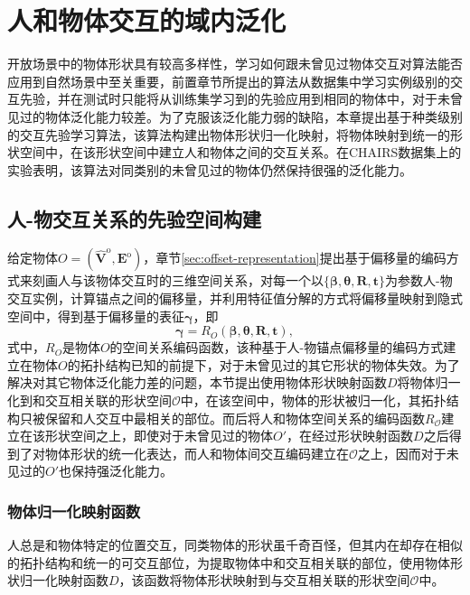 \chapter{人和物体交互的域内泛化}\label{chap:stackflow_plus}
开放场景中的物体形状具有较高多样性，学习如何跟未曾见过物体交互对算法能否应用到自然场景中至关重要，前置章节所提出的算法从数据集中学习实例级别的交互先验，并在测试时只能将从训练集学习到的先验应用到相同的物体中，对于未曾见过的物体泛化能力较差。为了克服该泛化能力弱的缺陷，本章提出基于种类级别的交互先验学习算法，该算法构建出物体形状归一化映射，将物体映射到统一的形状空间中，在该形状空间中建立人和物体之间的交互关系。在CHAIRS数据集上的实验表明，该算法对同类别的未曾见过的物体仍然保持很强的泛化能力。

\section{人-物交互关系的先验空间构建}

给定物体$O = (\hat{\mathbf{V}}^{\text{o}}, \mathbf{E}^{\text{o}})$，章节\ref{sec:offset-representation}提出基于偏移量的编码方式来刻画人与该物体交互时的三维空间关系，对每一个以$\{\mathbf{\beta}, \mathbf{\theta}, \mathbf{R}, \mathbf{t}\}$为参数人-物交互实例，计算锚点之间的偏移量，并利用特征值分解的方式将偏移量映射到隐式空间中，得到基于偏移量的表征$\mathbf{\gamma}$，即
\begin{equation}
	\mathbf{\gamma} = R_{O} (\mathbf{\beta}, \mathbf{\theta}, \mathbf{R}, \mathbf{t}),
\end{equation}
式中，$R_{O}$是物体$O$的空间关系编码函数，该种基于人-物锚点偏移量的编码方式建立在物体$O$的拓扑结构已知的前提下，对于未曾见过的其它形状的物体失效。为了解决对其它物体泛化能力差的问题，本节提出使用物体形状映射函数$D$将物体归一化到和交互相关联的形状空间$\mathcal{O}$中，在该空间中，物体的形状被归一化，其拓扑结构只被保留和人交互中最相关的部位。而后将人和物体空间关系的编码函数$R_{\mathcal{O}}$建立在该形状空间之上，即使对于未曾见过的物体$O'$，在经过形状映射函数$D$之后得到了对物体形状的统一化表达，而人和物体间交互编码建立在$\mathcal{O}$之上，因而对于未见过的$O'$也保持强泛化能力。

\subsection{物体归一化映射函数}
人总是和物体特定的位置交互，同类物体的形状虽千奇百怪，但其内在却存在相似的拓扑结构和统一的可交互部位，为提取物体中和交互相关联的部位，使用物体形状归一化映射函数$D$，该函数将物体形状映射到与交互相关联的形状空间$\mathcal{O}$中。


